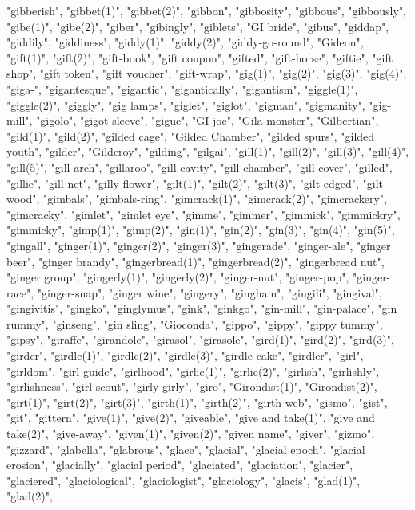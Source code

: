 "gibberish",
"gibbet(1)",
"gibbet(2)",
"gibbon",
"gibbosity",
"gibbous",
"gibbously",
"gibe(1)",
"gibe(2)",
"giber",
"gibingly",
"giblets",
"GI bride",
"gibus",
"giddap",
"giddily",
"giddiness",
"giddy(1)",
"giddy(2)",
"giddy-go-round",
"Gideon",
"gift(1)",
"gift(2)",
"gift-book",
"gift coupon",
"gifted",
"gift-horse",
"giftie",
"gift shop",
"gift token",
"gift voucher",
"gift-wrap",
"gig(1)",
"gig(2)",
"gig(3)",
"gig(4)",
"giga-",
"gigantesque",
"gigantic",
"gigantically",
"gigantism",
"giggle(1)",
"giggle(2)",
"giggly",
"gig lamps",
"giglet",
"giglot",
"gigman",
"gigmanity",
"gig-mill",
"gigolo",
"gigot sleeve",
"gigue",
"GI joe",
"Gila monster",
"Gilbertian",
"gild(1)",
"gild(2)",
"gilded cage",
"Gilded Chamber",
"gilded spurs",
"gilded youth",
"gilder",
"Gilderoy",
"gilding",
"gilgai",
"gill(1)",
"gill(2)",
"gill(3)",
"gill(4)",
"gill(5)",
"gill arch",
"gillaroo",
"gill cavity",
"gill chamber",
"gill-cover",
"gilled",
"gillie",
"gill-net",
"gilly flower",
"gilt(1)",
"gilt(2)",
"gilt(3)",
"gilt-edged",
"gilt-wood",
"gimbals",
"gimbals-ring",
"gimcrack(1)",
"gimcrack(2)",
"gimcrackery",
"gimcracky",
"gimlet",
"gimlet eye",
"gimme",
"gimmer",
"gimmick",
"gimmickry",
"gimmicky",
"gimp(1)",
"gimp(2)",
"gin(1)",
"gin(2)",
"gin(3)",
"gin(4)",
"gin(5)",
"gingall",
"ginger(1)",
"ginger(2)",
"ginger(3)",
"gingerade",
"ginger-ale",
"ginger beer",
"ginger brandy",
"gingerbread(1)",
"gingerbread(2)",
"gingerbread nut",
"ginger group",
"gingerly(1)",
"gingerly(2)",
"ginger-nut",
"ginger-pop",
"ginger-race",
"ginger-snap",
"ginger wine",
"gingery",
"gingham",
"gingili",
"gingival",
"gingivitis",
"gingko",
"ginglymus",
"gink",
"ginkgo",
"gin-mill",
"gin-palace",
"gin rummy",
"ginseng",
"gin sling",
"Gioconda",
"gippo",
"gippy",
"gippy tummy",
"gipsy",
"giraffe",
"girandole",
"girasol",
"girasole",
"gird(1)",
"gird(2)",
"gird(3)",
"girder",
"girdle(1)",
"girdle(2)",
"girdle(3)",
"girdle-cake",
"girdler",
"girl",
"girldom",
"girl guide",
"girlhood",
"girlie(1)",
"girlie(2)",
"girlish",
"girlishly",
"girlishness",
"girl scout",
"girly-girly",
"giro",
"Girondist(1)",
"Girondist(2)",
"girt(1)",
"girt(2)",
"girt(3)",
"girth(1)",
"girth(2)",
"girth-web",
"gismo",
"gist",
"git",
"gittern",
"give(1)",
"give(2)",
"giveable",
"give and take(1)",
"give and take(2)",
"give-away",
"given(1)",
"given(2)",
"given name",
"giver",
"gizmo",
"gizzard",
"glabella",
"glabrous",
"glace",
"glacial",
"glacial epoch",
"glacial erosion",
"glacially",
"glacial period",
"glaciated",
"glaciation",
"glacier",
"glaciered",
"glaciological",
"glaciologist",
"glaciology",
"glacis",
"glad(1)",
"glad(2)",
